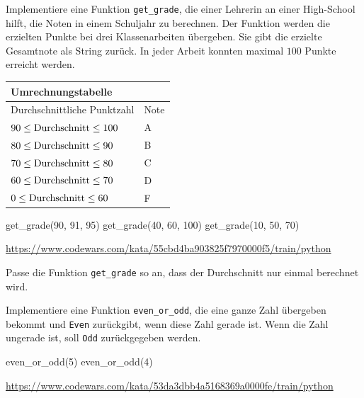 \documentclass[class=scrartcl, crop=false]{standalone}
\begin{document}
\begin{aufgabe} \noindent
Implementiere eine Funktion \texttt{get_grade}, die einer Lehrerin an einer High-School hilft, die Noten in einem Schuljahr zu berechnen. Der Funktion werden die erzielten Punkte bei drei Klassenarbeiten übergeben. Sie gibt die erzielte Gesamtnote als String zurück. In jeder Arbeit konnten maximal $100$ Punkte erreicht werden.

\begin{table}[H]
\centering
	\begin{tabular}{ll} 
		\toprule
		Umrechnungstabelle \\  
		\midrule 
		Durchschnittliche Punktzahl & Note \\ 
		\midrule 
		$90 \leq \textnormal{Durchschnitt} \leq 100$ & A \\
		$80 \leq \textnormal{Durchschnitt} \leq 90$ & B \\
		$70 \leq \textnormal{Durchschnitt} \leq 80$ & C \\
		$60 \leq \textnormal{Durchschnitt} \leq 70$ & D \\
		$0 \leq  \textnormal{Durchschnitt} \le 60$ & F \\
		\bottomrule
	\end{tabular}
\end{table}

\begin{pyconsole}
get_grade(90, 91, 95)
get_grade(40, 60, 100)
get_grade(10, 50, 70)
\end{pyconsole}

	
\noindent\url{https://www.codewars.com/kata/55cbd4ba903825f7970000f5/train/python}
	
\end{aufgabe}


\begin{aufgabe} \noindent
Passe die Funktion \texttt{get_grade} so an, dass der Durchschnitt nur einmal berechnet wird.
\end{aufgabe}


\begin{aufgabe} \noindent
Implementiere eine Funktion \texttt{even_or_odd}, die eine ganze Zahl übergeben bekommt und \texttt{Even} zurückgibt, wenn diese Zahl gerade ist. Wenn die Zahl ungerade ist, soll \texttt{Odd} zurückgegeben werden. 
	
\begin{pyconsole}
even_or_odd(5)
even_or_odd(4)
\end{pyconsole}

\noindent\url{https://www.codewars.com/kata/53da3dbb4a5168369a0000fe/train/python}	

\end{aufgabe}
\end{document}

